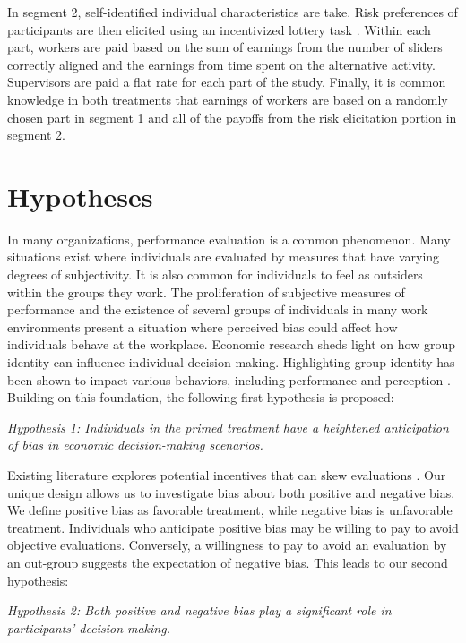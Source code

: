  In segment 2, self-identified individual characteristics are take. Risk preferences of participants are then elicited using an incentivized lottery task \citep{eckel2008}. Within each part, workers are paid based on the sum of earnings from the number of sliders correctly aligned and the earnings from time spent on the alternative activity. Supervisors are paid a flat rate for each part of the study. Finally, it is common knowledge in both treatments that earnings of workers are based on a randomly chosen part in segment 1 and all of the payoffs from the risk elicitation portion in segment 2.   

\section{Hypotheses} \label{sec:Hypotheses}
In many organizations, performance evaluation is a common phenomenon. Many situations exist where individuals are evaluated by measures that have varying degrees of subjectivity. It is also common for individuals to feel as outsiders within the groups they work. The proliferation of subjective measures of performance and the existence of several groups of individuals in many work environments present a situation where perceived bias could affect how individuals behave at the workplace. Economic research sheds light on how group identity can influence individual decision-making. Highlighting group identity has been shown to impact various behaviors, including performance \citep{aronson1998} and perception \citep{bargh1982}. Building on this foundation, the following first hypothesis is proposed: 
 
 \textit{Hypothesis 1:  Individuals in the primed treatment have a heightened anticipation of bias in economic decision-making scenarios. }

 Existing literature explores potential incentives that can skew evaluations \citep{carpenter2010}. Our unique design allows us to investigate bias about both positive and negative bias. We define positive bias as favorable treatment, while negative bias is unfavorable treatment. Individuals who anticipate positive bias may be willing to pay to avoid objective evaluations. Conversely, a willingness to pay to avoid an evaluation by an out-group suggests the expectation of negative bias. This leads to our second hypothesis:

  \textit{Hypothesis 2: Both positive and negative bias play a significant role in participants' decision-making.}

